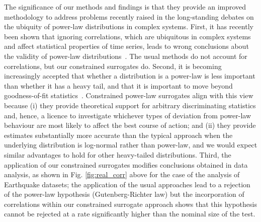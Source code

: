 \documentclass[%
prx,
reprint,
superscriptaddress,
nofootinbib,
 amsmath,amssymb,
 aps,
floatfix,
]{revtex4-2}
\begin{document}
The significance of our methods and findings is that they provide an improved methodology to address problems recently raised in the long-standing debates on the ubiquity of power-law distributions in complex systems. 
First, it has recently been shown that ignoring correlations, which are ubiquitous in complex systems and affect statistical properties of time series, leads to wrong conclusions about the validity of power-law distributions~\cite{gerlach2019testing}. The usual methods do not account for correlations, but our constrained surrogates do. Second, it is becoming increasingly accepted that whether a distribution is a power-law is less important than whether it has a heavy tail, and that it is important to move beyond goodness-of-fit statistics~\cite{stumpf2012critical,holme2019rare}. Constrained power-law surrogates align with this view because (i) they provide theoretical support for arbitrary discriminating statistics and, hence, a licence to investigate whichever types of deviation from power-law behaviour are most likely to affect the best course of action; and (ii) they provide estimates substantially more accurate than the typical approach when the underlying distribution is log-normal rather than power-law, and we would expect similar advantages to hold for other heavy-tailed distributions. Third, the application of our constrained surrogates modifies conclusions obtained in data analysis, as shown in Fig. \ref{fig:real_corr} above for the case of the analysis of Earthquake datasets; the application of the usual approaches lead to a rejection of the power-law hypothesis (Gutenberg-Richter law) but the incorporation of correlations within our constrained surrogate approach shows that this hypothesis cannot be rejected at a rate significantly higher than the nominal size of the test.
\end{document}
